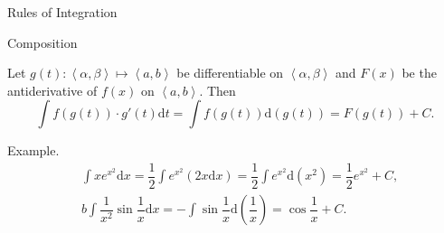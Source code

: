 \documentclass{beamer}
\begin{document}
    \begin{frame}[t]{Rules of Integration}
        \begin{block}{Composition}
            \par Let $g(t): \left\langle\alpha,\beta\right\rangle \mapsto \left\langle a, b\right\rangle$ be differentiable on $\left\langle\alpha,\beta\right\rangle$ and $F(x)$ be the antiderivative of $f(x)$ on $\left\langle a, b\right\rangle$. Then $$\int f(g(t))\cdot g'(t)\mathrm{d}t = \int f(g(t))\mathrm{d}(g(t)) = F(g(t)) + C.$$
        \end{block}
        \par \textcolor{yy}{Example.}
        \begin{equation*}
            \begin{aligned}
                & \int x e^{x^2} \mathrm{d}x = \dfrac{1}{2}\int e^{x^2} (2x\mathrm{d}x) = \dfrac{1}{2}\int e^{x^2}\mathrm{d}(x^2) = \dfrac{1}{2}e^{x^2} + C, \\
                & b\int\dfrac{1}{x^2}\sin\dfrac{1}{x}\mathrm{d}x = -\int \sin \dfrac{1}{x}\mathrm{d}\left(\dfrac{1}{x}\right) = \cos \dfrac{1}{x} + C.
            \end{aligned}
        \end{equation*}
    \end{frame}
\end{document}

